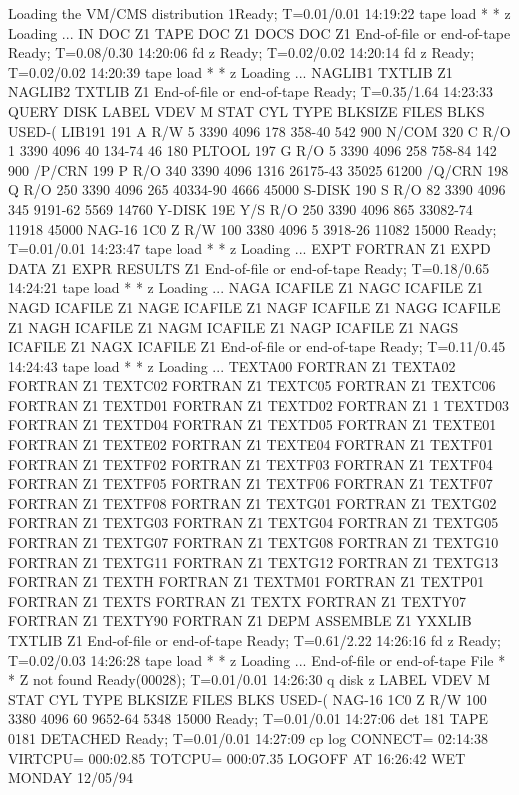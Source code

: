 \begin{XMPt}{Loading the VM/CMS distribution}
1Ready; T=0.01/0.01 14:19:22
 tape load * * z
  Loading ...
  IN       DOC      Z1
  TAPE     DOC      Z1
  DOCS     DOC      Z1
  End-of-file or end-of-tape
 Ready; T=0.08/0.30 14:20:06
 fd z
 Ready; T=0.02/0.02 14:20:14
 fd z
 Ready; T=0.02/0.02 14:20:39
 tape load * * z
  Loading ...
  NAGLIB1  TXTLIB   Z1
  NAGLIB2  TXTLIB   Z1
  End-of-file or end-of-tape
 Ready; T=0.35/1.64 14:23:33
 QUERY DISK
 LABEL  VDEV M  STAT  CYL TYPE BLKSIZE  FILES  BLKS USED-(%
 LIB191 191  A   R/W    5 3390 4096       178        358-40        542        900
 N/COM  320  C   R/O    1 3390 4096        40        134-74         46        180
 PLTOOL 197  G   R/O    5 3390 4096       258        758-84        142        900
 /P/CRN 199  P   R/O  340 3390 4096      1316      26175-43      35025      61200
 /Q/CRN 198  Q   R/O  250 3390 4096       265      40334-90       4666      45000
 S-DISK 190  S   R/O   82 3390 4096       345       9191-62       5569      14760
 Y-DISK 19E  Y/S R/O  250 3390 4096       865      33082-74      11918      45000
 NAG-16 1C0  Z   R/W  100 3380 4096         5       3918-26      11082      15000
 Ready; T=0.01/0.01 14:23:47
 tape load * * z
  Loading ...
  EXPT     FORTRAN  Z1
  EXPD     DATA     Z1
  EXPR     RESULTS  Z1
  End-of-file or end-of-tape
 Ready; T=0.18/0.65 14:24:21
 tape load * * z
  Loading ...
  NAGA     ICAFILE  Z1
  NAGC     ICAFILE  Z1
  NAGD     ICAFILE  Z1
  NAGE     ICAFILE  Z1
  NAGF     ICAFILE  Z1
  NAGG     ICAFILE  Z1
  NAGH     ICAFILE  Z1
  NAGM     ICAFILE  Z1
  NAGP     ICAFILE  Z1
  NAGS     ICAFILE  Z1
  NAGX     ICAFILE  Z1
  End-of-file or end-of-tape
 Ready; T=0.11/0.45 14:24:43
 tape load * * z
  Loading ...
  TEXTA00  FORTRAN  Z1
  TEXTA02  FORTRAN  Z1
  TEXTC02  FORTRAN  Z1
  TEXTC05  FORTRAN  Z1
  TEXTC06  FORTRAN  Z1
  TEXTD01  FORTRAN  Z1
  TEXTD02  FORTRAN  Z1
1 TEXTD03  FORTRAN  Z1
  TEXTD04  FORTRAN  Z1
  TEXTD05  FORTRAN  Z1
  TEXTE01  FORTRAN  Z1
  TEXTE02  FORTRAN  Z1
  TEXTE04  FORTRAN  Z1
  TEXTF01  FORTRAN  Z1
  TEXTF02  FORTRAN  Z1
  TEXTF03  FORTRAN  Z1
  TEXTF04  FORTRAN  Z1
  TEXTF05  FORTRAN  Z1
  TEXTF06  FORTRAN  Z1
  TEXTF07  FORTRAN  Z1
  TEXTF08  FORTRAN  Z1
  TEXTG01  FORTRAN  Z1
  TEXTG02  FORTRAN  Z1
  TEXTG03  FORTRAN  Z1
  TEXTG04  FORTRAN  Z1
  TEXTG05  FORTRAN  Z1
  TEXTG07  FORTRAN  Z1
  TEXTG08  FORTRAN  Z1
  TEXTG10  FORTRAN  Z1
  TEXTG11  FORTRAN  Z1
  TEXTG12  FORTRAN  Z1
  TEXTG13  FORTRAN  Z1
  TEXTH    FORTRAN  Z1
  TEXTM01  FORTRAN  Z1
  TEXTP01  FORTRAN  Z1
  TEXTS    FORTRAN  Z1
  TEXTX    FORTRAN  Z1
  TEXTY07  FORTRAN  Z1
  TEXTY90  FORTRAN  Z1
  DEPM     ASSEMBLE Z1
  YXXLIB   TXTLIB   Z1
  End-of-file or end-of-tape
 Ready; T=0.61/2.22 14:26:16
 fd z
 Ready; T=0.02/0.03 14:26:28
 tape load * * z
  Loading ...
  End-of-file or end-of-tape
 File * * Z not found
 Ready(00028); T=0.01/0.01 14:26:30
 q disk z
 LABEL  VDEV M  STAT  CYL TYPE BLKSIZE  FILES  BLKS USED-(%
 NAG-16 1C0  Z   R/W  100 3380 4096        60       9652-64       5348      15000
 Ready; T=0.01/0.01 14:27:06
 det 181
 TAPE 0181 DETACHED
 Ready; T=0.01/0.01 14:27:09
 cp log
 CONNECT= 02:14:38 VIRTCPU= 000:02.85 TOTCPU= 000:07.35
 LOGOFF AT 16:26:42 WET MONDAY 12/05/94
\end{XMPt}

